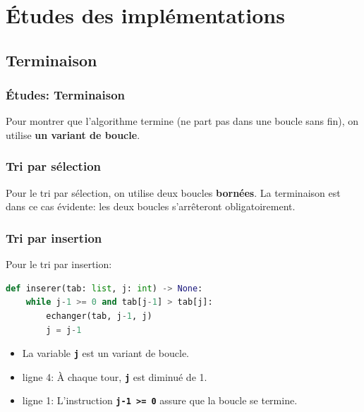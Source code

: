 \documentclass[svgnames,11pt]{beamer}
\begin{document}
\section{Études des implémentations}
\subsection{Terminaison}
\begin{frame}
    \frametitle{Études: Terminaison}

\begin{aretenir}[]
Pour montrer que l'algorithme termine (ne part pas dans une boucle sans fin), on utilise \textbf{un variant de boucle}.
\end{aretenir}

\end{frame}
\begin{frame}
    \frametitle{Tri par sélection}

    Pour le tri par sélection, on utilise deux boucles \textbf{bornées}. La terminaison est dans ce cas évidente: les deux boucles s'arrêteront obligatoirement.

\end{frame}
\begin{frame}[fragile]
    \frametitle{Tri par insertion}
Pour le tri par insertion:
\begin{center}
\begin{lstlisting}[language=Python , basicstyle=\ttfamily\small, xleftmargin=2em, xrightmargin=0em]
def inserer(tab: list, j: int) -> None:
    while j-1 >= 0 and tab[j-1] > tab[j]:
        echanger(tab, j-1, j)
        j = j-1
\end{lstlisting}
\label{CODE}
\end{center}
    \begin{itemize}
        \item La variable \textbf{\texttt{j}} est un variant de boucle. 
        \item ligne 4: À chaque tour, \textbf{\texttt{j}} est diminué de 1.
        \item ligne 1: L'instruction \textbf{\texttt{j-1 >= 0}} assure que la boucle se termine.
    \end{itemize}

\end{frame}
\end{document}
